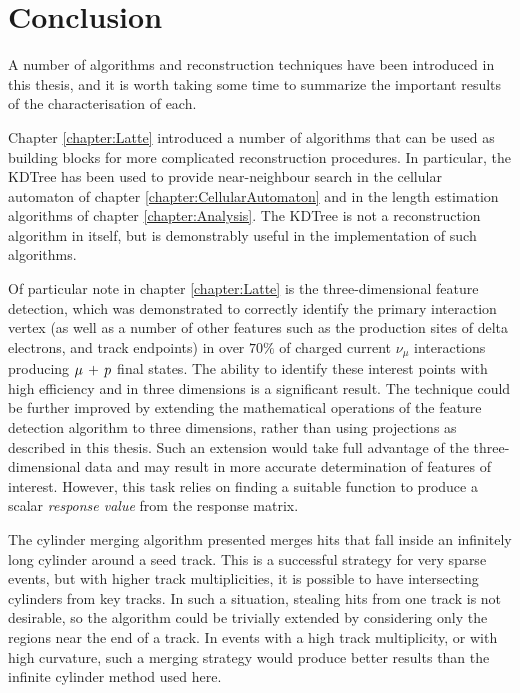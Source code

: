 \chapter{Conclusion}\label{chapter:Conclusion}
A number of algorithms and reconstruction techniques have been introduced in this thesis, and it is worth taking some time to summarize the important results of the characterisation of each.

Chapter \ref{chapter:Latte} introduced a number of algorithms that can be used as building blocks for more complicated reconstruction procedures. In particular, the KDTree has been used to provide near-neighbour search in the cellular automaton of chapter \ref{chapter:CellularAutomaton} and in the length estimation algorithms of chapter \ref{chapter:Analysis}. The KDTree is not a reconstruction algorithm in itself, but is demonstrably useful in the implementation of such algorithms.

Of particular note in chapter \ref{chapter:Latte} is the three-dimensional feature detection, which was demonstrated to correctly identify the primary interaction vertex (as well as a number of other features such as the production sites of delta electrons, and track endpoints) in over $70\%$ of charged current $\nu_\mu$ interactions producing $\mu\,+\,p$ final states. The ability to identify these interest points with high efficiency and in three dimensions is a significant result. The technique could be further improved by extending the mathematical operations of the feature detection algorithm to three dimensions, rather than using projections as described in this thesis. Such an extension would take full advantage of the three-dimensional data and may result in more accurate determination of features of interest. However, this task relies on finding a suitable function to produce a scalar \emph{response value} from the response matrix.

The cylinder merging algorithm presented merges hits that fall inside an infinitely long cylinder around a seed track. This is a successful strategy for very sparse events, but with higher track multiplicities, it is possible to have intersecting cylinders from key tracks. In such a situation, stealing hits from one track is not desirable, so the algorithm could be trivially extended by considering only the regions near the end of a track. In events with a high track multiplicity, or with high curvature, such a merging strategy would produce better results than the infinite cylinder method used here.

